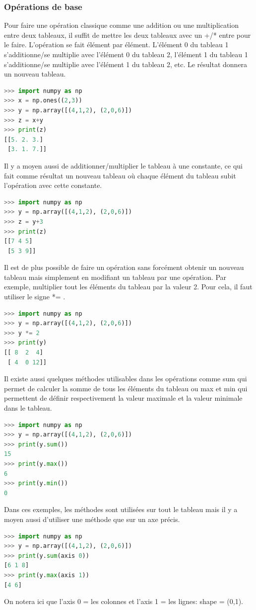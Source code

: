 \documentclass[a4paper, 12pt]{article}
\numberwithin{equation}{subsection}
\begin{document}
\subsubsection{Opérations de base}
Pour faire une opération classique comme une addition ou une multiplication entre deux tableaux, il suffit de mettre les deux tableaux avec un +/* entre pour le faire. L’opération se fait élément par élément. L’élément 0 du tableau 1 s’additionne/se multiplie avec l’élément 0 du tableau 2, l’élément 1 du tableau 1 s’additionne/se multiplie avec l’élément 1 du tableau 2, etc. Le résultat donnera un nouveau tableau.
\begin{lstlisting}[language=Python]
>>> import numpy as np
>>> x = np.ones((2,3))
>>> y = np.array([(4,1,2), (2,0,6)])
>>> z = x+y
>>> print(z)
[[5. 2. 3.]
 [3. 1. 7.]]
\end{lstlisting}
Il y a moyen aussi de additionner/multiplier le tableau à une constante, ce qui fait comme résultat un nouveau tableau où chaque élément du tableau subit l’opération avec cette constante.
\begin{lstlisting}[language=Python]
>>> import numpy as np
>>> y = np.array([(4,1,2), (2,0,6)])
>>> z = y+3
>>> print(z)
[[7 4 5]
 [5 3 9]]
\end{lstlisting}
Il est de plus possible de faire un opération sans forcément obtenir un nouveau tableau mais simplement en modifiant un tableau par une opération. Par exemple, multiplier tout les éléments du tableau par la valeur 2. Pour cela, il faut utiliser le signe *= .
\begin{lstlisting}[language=Python]
>>> import numpy as np
>>> y = np.array([(4,1,2), (2,0,6)])
>>> y *= 2
>>> print(y)
[[ 8  2  4]
 [ 4  0 12]]
\end{lstlisting}
Il existe aussi quelques méthodes utilisables dans les opérations comme sum qui permet de calculer la somme de tous les éléments du tableau ou max et min qui permettent de définir respectivement la valeur maximale et la valeur minimale dans le tableau.
\begin{lstlisting}[language=Python]
>>> import numpy as np
>>> y = np.array([(4,1,2), (2,0,6)])
>>> print(y.sum())
15
>>> print(y.max())
6
>>> print(y.min())
0
\end{lstlisting}
Dans ces exemples, les méthodes sont utilisées sur tout le tableau mais il y a moyen aussi d'utiliser une méthode que sur un axe précis.
\begin{lstlisting}[language=Python]
>>> import numpy as np
>>> y = np.array([(4,1,2), (2,0,6)])
>>> print(y.sum(axis 0))
[6 1 8]
>>> print(y.max(axis 1))
[4 6]
\end{lstlisting}
On notera ici que l’axis 0 = les colonnes et l’axis 1 = les lignes: shape = (0,1).
\end{document}
